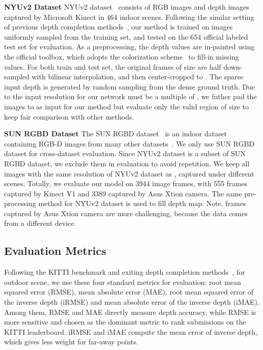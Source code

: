 \documentclass[journal]{IEEEtran}
\begin{document}
{\bf NYUv2 Dataset}
NYUv2 dataset~\cite{NYU_V2} consists of RGB images and depth images captured by Microsoft Kinect in 464 indoor scenes. 
Following the similar setting of previous depth completion methods~\cite{depth_affinity,deep_lidar,sparse_to_dense}, 
our method is trained on  images uniformly sampled from the training set, and tested on the 654 official labeled test set for evaluation.
As a preprocessing, the depth values are in-painted using the official toolbox, which adopts the colorization scheme~\cite{colorization} to fill-in missing values.
For both train and test set, the original frames of size  are half down-sampled with bilinear interpolation, and then center-cropped to . 
The sparse input depth is generated by random sampling from the dense ground truth.
Due to the input resolution for our network must be a multiple of ,
we futher pad the images to  as input for our method but evaluate only the valid region of size  to keep fair comparison with other methods.

{\bf SUN RGBD Dataset}
The SUN RGBD dataset~\cite{sun_rgbd} is an indoor dataset containing RGB-D images from many other datasets~\cite{NYU_V2,B3DO,sun_3d}.
We only use SUN RGBD dataset for cross-dataset evaluation.
Since NYUv2 dataset is a subset of SUN RGBD dataset, we exclude them in evaluation to avoid repetition.
We keep all images with the same resolution of NYUv2 dataset as , captured under different scenes.
Totally, we evaluate our model on 3944 image frames, with 555 frames captured by Kinect V1 and 3389 captured by Asus Xtion camera.
The same pre-processing method for NYUv2 dataset is used to fill depth map.
Note, frames captured by Asus Xtion camera are more challenging, because the data comes from a different device.



\subsection{Evaluation Metrics} 
\label{subsec:metric}
Following the KITTI benchmark and exiting depth completion methods~\cite{depth_affinity, deep_lidar, self_supervised}, for outdoor scene,
we use these four standard metrics for evaluation:
root mean squared error (RMSE), mean absolute error (MAE), root mean squared error of the inverse depth (iRMSE) and mean absolute error of the inverse depth (iMAE).
Among them, RMSE and MAE directly measure depth accuracy, while RMSE is more sensitive and chosen as the dominant metric to rank submissions on the KITTI leaderboard. 
iRMSE and iMAE compute the mean error of inverse depth, which gives less weight for far-away points.
\end{document}
